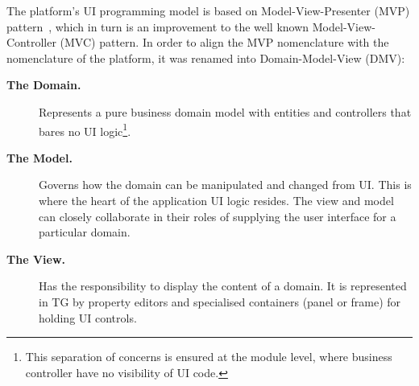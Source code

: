   The platform's UI programming model is based on Model-View-Presenter (MVP) pattern~\cite{BoGl2000}, which in turn is an improvement to the well known Model-View-Controller (MVC) pattern.  
  In order to align the MVP nomenclature with the nomenclature of the platform, it was renamed into Domain-Model-View (DMV):
  \begin{description}
    \item[\textbf{The Domain.}] Represents a pure business domain model with entities and controllers that bares no UI logic\footnote{This separation of concerns is ensured at the module level, where business controller have no visibility of UI code.}.
    \item [\textbf{The Model.}] Governs how the domain can be manipulated and changed from UI. 
	This is where the heart of the application UI logic resides. The view and model can closely collaborate in their roles of supplying the user interface for a particular domain.
    \item[\textbf{The View.}] Has the responsibility to display the content of a domain. 
	It is represented in TG by property editors and specialised containers (panel or frame) for holding UI controls.    
  \end{description}

